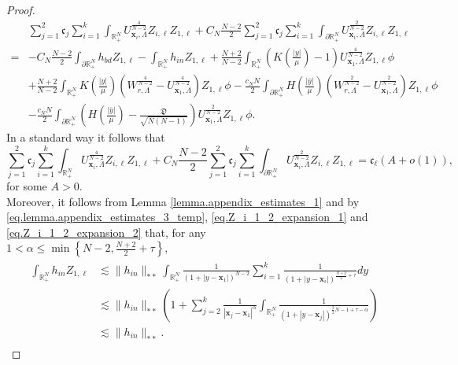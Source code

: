 \documentclass[11pt,a4paper]{amsart}
\begin{document}
\begin{proof}
\begin{equation}\label{eq.matrix_cj}
  \begin{aligned}
 & \sum_{j=1}^2\mathfrak c_j\sum_{i=1}^k\int_{\mathbb R^{N}_+}U_{\mathbf{x}_i,\Lambda}^{\frac{4}{N-2}}Z_{i,\ell}Z_{1, \ell}+C_N\frac{N-2}{2}\sum_{j=1}^2\mathfrak c_j\sum_{i=1}^k\int_{\partial\mathbb R^N_+}U_{\mathbf{x}_i,\Lambda}^{\frac{2}{N-2}}Z_{i,\ell}Z_{1, \ell}\\
 =&-C_N\frac{N-2}{2}\int_{\partial\mathbb R^N_+}h_{bd}Z_{1, \ell}-\int_{\mathbb R^{N}_+}h_{in}Z_{1, \ell}+\frac{N+2}{N-2}\int_{\mathbb R^N_+}\left(K\left(\frac{|y|}{\mu}\right)-1\right)U_{\mathbf{x}_1,\Lambda}^{\frac{4}{N-2}}Z_{1, \ell}\phi\\&+\frac{N+2}{N-2}\int_{\mathbb R^N_+}K\left(\frac{|y|}{\mu}\right)\left(W_{r, \Lambda}^{\frac{4}{N-2}}-U_{\mathbf{x}_1,\Lambda}^{\frac{4}{N-2}}\right)Z_{1, \ell}\phi-\frac{c_N N}{2}\int_{\partial\mathbb R^N_+}H\left(\frac{|\bar y|}{\mu}\right)\left(W_{r, \Lambda}^{\frac{2}{N-2}}-U_{\mathbf{x}_1,\Lambda}^{\frac{2}{N-2}}\right)Z_{1, \ell}\phi\\&-\frac{c_N N}{2}\int_{\partial\mathbb R^N_+}\left(H\left(\frac{|\bar y|}{\mu}\right)-\frac{\mathfrak D}{\sqrt{N(N-1)}}\right)U_{\mathbf{x}_1,\Lambda}^{\frac{2}{N-2}}Z_{1, \ell}\phi.
  \end{aligned}
\end{equation}
In a standard way it follows that
$$\sum_{j=1}^2\mathfrak c_j\sum_{i=1}^k\int_{\mathbb R^{N}_+}U_{\mathbf{x}_i,\Lambda}^{\frac{4}{N-2}}Z_{i,\ell}Z_{1, \ell}+C_N\frac{N-2}{2}\sum_{j=1}^2\mathfrak c_j\sum_{i=1}^k\int_{\partial\mathbb R^N_+}U_{\mathbf{x}_i,\Lambda}^{\frac{2}{N-2}}Z_{i,\ell}Z_{1, \ell}=\mathfrak c_\ell(A+o(1)),$$
for some $A>0$.\\
Moreover, it follows from Lemma \ref{lemma.appendix_estimates_1} and by \eqref{eq.lemma.appendix_estimates_3_temp}, \eqref{eq.Z_i_1_2_expansion_1} and \eqref{eq.Z_i_1_2_expansion_2} that,
for any \\ $1<\alpha\leq \min\left\{N-2, \frac{N+2}{2}+\tau\right\}$,
\begin{align*}
  \begin{aligned}
  \int_{\mathbb R^N_+} h_{in}Z_{1, \ell}& \lesssim \|h_{in}\|_{**} \int_{\mathbb{R}_{+}^{N}} \frac{1}{\left(1+\left|y-\mathbf{x}_{1}\right|\right)^{N-2}} \sum_{i=1}^{k} \frac{1}{\left(1+\left|y-\mathbf{x}_{i}\right|\right)^{\frac{N+2}{2}+\tau}} d y \\
  & \lesssim\|h_{in}\|_{**}\left(1+\sum_{j=2}^k\frac{1}{|\mathbf x_j-\mathbf x_1|^\alpha}\int_{\mathbb R^N_+}\frac{1}{\left(1+\left|y-\mathbf{x}_{j}\right|\right)^{\frac{3}{2}N-1+\tau-\alpha}}\right)\\&\lesssim\|h_{in}\|_{**} .    \end{aligned}
\end{align*}


\end{proof}
\end{document}
